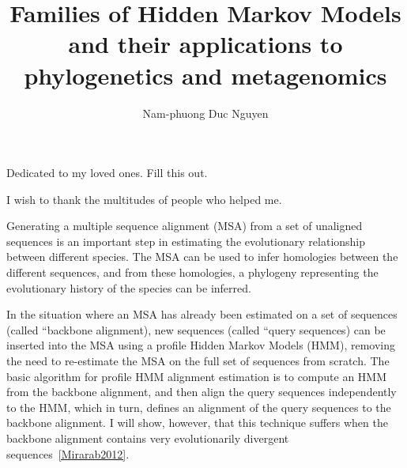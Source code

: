 \documentclass[12pt]{report}	%
\author{Nam-phuong Duc Nguyen}  	%
\title{Families of Hidden Markov Models and their applications to phylogenetics and metagenomics}
\theoremstyle{definition}
\theoremstyle{remark}
\begin{document}
\sloppy
\copyrightpage          %


%
%
%
\commcertpage           %

\titlepage              %



%
\begin{dedication}
%
Dedicated to my loved ones.  Fill this out.
\end{dedication}


\begin{acknowledgments}%
%
I wish to thank the multitudes of people who helped me.   
\end{acknowledgments}



\utabstract
{}%
\indent

Generating a multiple sequence alignment (MSA) from 
a set of unaligned sequences is an important step in
estimating the evolutionary relationship between
different species.  The MSA can be used to infer homologies
between the different sequences, and from these homologies,
a phylogeny representing the evolutionary history of the species can be inferred.

In the situation where an MSA has
already been estimated on a set of sequences (called ``backbone alignment), new sequences (called ``query sequences) can be inserted into the MSA using a profile Hidden Markov Models (HMM), removing the need to re-estimate the MSA on the full set of sequences from scratch.  The basic algorithm for profile HMM alignment estimation is to compute an HMM from the backbone alignment, and then align the query sequences independently to the HMM, which in turn, defines an alignment of the query sequences to the backbone alignment.  I will show, however, that this technique suffers when the backbone alignment contains very evolutionarily divergent
sequences~\ref{Mirarab2012}.  
\end{document}
